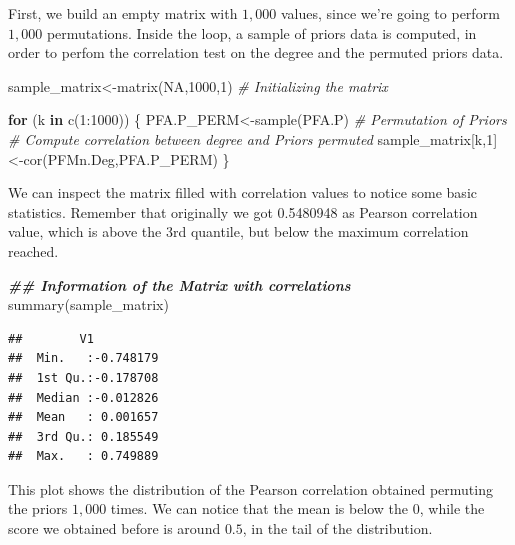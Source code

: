 \documentclass[
  notitlepage,
  onecolumn,
  openany]{book}
\newenvironment{Shaded}{\begin{snugshade}}{\end{snugshade}}
\newcommand{\CommentTok}[1]{\textcolor[rgb]{0.56,0.35,0.01}{\textit{#1}}}
\newcommand{\ConstantTok}[1]{\textcolor[rgb]{0.00,0.00,0.00}{#1}}
\newcommand{\ControlFlowTok}[1]{\textcolor[rgb]{0.13,0.29,0.53}{\textbf{#1}}}
\newcommand{\DecValTok}[1]{\textcolor[rgb]{0.00,0.00,0.81}{#1}}
\newcommand{\DocumentationTok}[1]{\textcolor[rgb]{0.56,0.35,0.01}{\textbf{\textit{#1}}}}
\newcommand{\FunctionTok}[1]{\textcolor[rgb]{0.00,0.00,0.00}{#1}}
\newcommand{\NormalTok}[1]{#1}
\newcommand{\OtherTok}[1]{\textcolor[rgb]{0.56,0.35,0.01}{#1}}
\newcommand{\SpecialCharTok}[1]{\textcolor[rgb]{0.00,0.00,0.00}{#1}}
\begin{document}
First, we build an empty matrix with \(1,000\) values, since we're going to perform \(1,000\) permutations. Inside the loop, a sample of priors data is computed, in order to perfom the correlation test on the degree and the permuted priors data.

\begin{Shaded}
\begin{Highlighting}[]
\NormalTok{sample\_matrix}\OtherTok{\textless{}{-}}\FunctionTok{matrix}\NormalTok{(}\ConstantTok{NA}\NormalTok{,}\DecValTok{1000}\NormalTok{,}\DecValTok{1}\NormalTok{) }\CommentTok{\# Initializing the matrix}

\ControlFlowTok{for}\NormalTok{ (k }\ControlFlowTok{in} \FunctionTok{c}\NormalTok{(}\DecValTok{1}\SpecialCharTok{:}\DecValTok{1000}\NormalTok{))}
\NormalTok{\{}
\NormalTok{  PFA.P\_PERM}\OtherTok{\textless{}{-}}\FunctionTok{sample}\NormalTok{(PFA.P) }\CommentTok{\# Permutation of Priors}
  \CommentTok{\# Compute correlation between degree and Priors permuted}
\NormalTok{  sample\_matrix[k,}\DecValTok{1}\NormalTok{]}\OtherTok{\textless{}{-}}\FunctionTok{cor}\NormalTok{(PFMn.Deg,PFA.P\_PERM) }
\NormalTok{\}}
\end{Highlighting}
\end{Shaded}

We can inspect the matrix filled with correlation values to notice some basic statistics. Remember that originally we got 0.5480948 as Pearson correlation value, which is above the 3rd quantile, but below the maximum correlation reached.

\begin{Shaded}
\begin{Highlighting}[]
\DocumentationTok{\#\# Information of the Matrix with correlations}
\FunctionTok{summary}\NormalTok{(sample\_matrix)}
\end{Highlighting}
\end{Shaded}

\begin{verbatim}
##        V1           
##  Min.   :-0.748179  
##  1st Qu.:-0.178708  
##  Median :-0.012826  
##  Mean   : 0.001657  
##  3rd Qu.: 0.185549  
##  Max.   : 0.749889
\end{verbatim}

This plot shows the distribution of the Pearson correlation obtained permuting the priors \(1,000\) times. We can notice that the mean is below the \(0\), while the score we obtained before is around \(0.5\), in the tail of the distribution.
\end{document}
